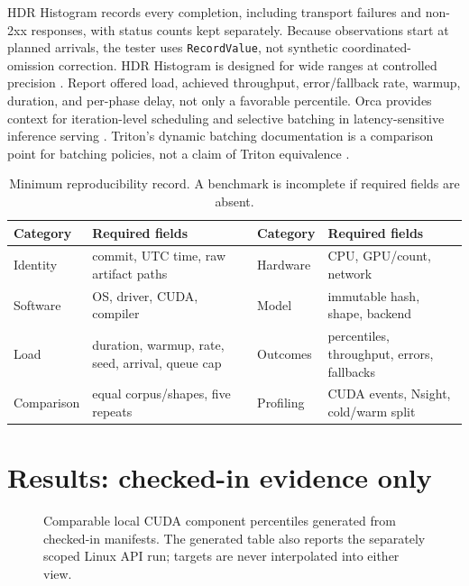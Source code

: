 \documentclass[10pt,a4paper,twocolumn]{article}
\newcommand{\code}[1]{\texttt{#1}}
\begin{document}
HDR Histogram records every completion, including transport failures and non-2xx
responses, with status counts kept separately. Because observations start at
planned arrivals, the tester uses \code{RecordValue}, not synthetic coordinated-
omission correction. HDR Histogram is designed for wide ranges at controlled
precision \cite{hdr}. Report offered load, achieved throughput, error/fallback
rate, warmup, duration, and per-phase delay, not only a favorable percentile.
Orca provides context for iteration-level scheduling and selective batching in
latency-sensitive inference serving \cite{orca}. Triton's dynamic batching
documentation is a comparison point for batching policies, not a claim of
Triton equivalence \cite{tritonbatch}.

\begin{table}[t]\centering\small
\caption{Minimum reproducibility record. A benchmark is incomplete if required fields are absent.}\label{tab:manifest}
\begin{tabularx}{\textwidth}{@{}p{}Yp{.16\textwidth}Y@{}}\toprule
Category & Required fields & Category & Required fields \\\midrule
Identity & commit, UTC time, raw artifact paths & Hardware & CPU, GPU/count, network \\
Software & OS, driver, CUDA, compiler & Model & immutable hash, shape, backend \\
Load & duration, warmup, rate, seed, arrival, queue cap & Outcomes & percentiles, throughput, errors, fallbacks \\
Comparison & equal corpus/shapes, five repeats & Profiling & CUDA events, Nsight, cold/warm split \\\bottomrule
\end{tabularx}\end{table}

\section{Results: checked-in evidence only}

\ResultEvidenceStatus

\begin{figure}[t]\centering\ResultEvidenceFigure
\caption{Comparable local CUDA component percentiles generated from checked-in
manifests. The generated table also reports the separately scoped Linux API
run; targets are never interpolated into either view.}\label{fig:results}
\end{figure}
\end{document}
